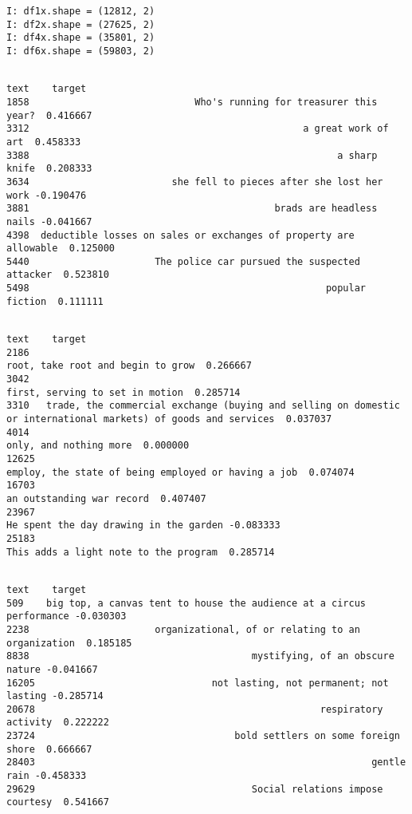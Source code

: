 \documentclass[a4paper,10pt,onecolumn,oneside,openright]{article}
\begin{document}
\begin{verbatim}
I: df1x.shape = (12812, 2)
I: df2x.shape = (27625, 2)
I: df4x.shape = (35801, 2)
I: df6x.shape = (59803, 2)
\end{verbatim}
\begin{verbatim}
                                                                   text    target
1858                             Who's running for treasurer this year?  0.416667
3312                                                a great work of art  0.458333
3388                                                      a sharp knife  0.208333
3634                         she fell to pieces after she lost her work -0.190476
3881                                           brads are headless nails -0.041667
4398  deductible losses on sales or exchanges of property are allowable  0.125000
5440                      The police car pursued the suspected attacker  0.523810
5498                                                    popular fiction  0.111111
\end{verbatim}
\begin{verbatim}
                                                                                                                 text    target
2186                                                                                root, take root and begin to grow  0.266667
3042                                                                                  first, serving to set in motion  0.285714
3310   trade, the commercial exchange (buying and selling on domestic or international markets) of goods and services  0.037037
4014                                                                                           only, and nothing more  0.000000
12625                                                             employ, the state of being employed or having a job  0.074074
16703                                                                                       an outstanding war record  0.407407
23967                                                                          He spent the day drawing in the garden -0.083333
25183                                                                           This adds a light note to the program  0.285714
\end{verbatim}
\begin{verbatim}
                                                                       text    target
509    big top, a canvas tent to house the audience at a circus performance -0.030303
2238                      organizational, of or relating to an organization  0.185185
8838                                       mystifying, of an obscure nature -0.041667
16205                               not lasting, not permanent; not lasting -0.285714
20678                                                  respiratory activity  0.222222
23724                                   bold settlers on some foreign shore  0.666667
28403                                                           gentle rain -0.458333
29629                                      Social relations impose courtesy  0.541667
\end{verbatim}
\end{document}
